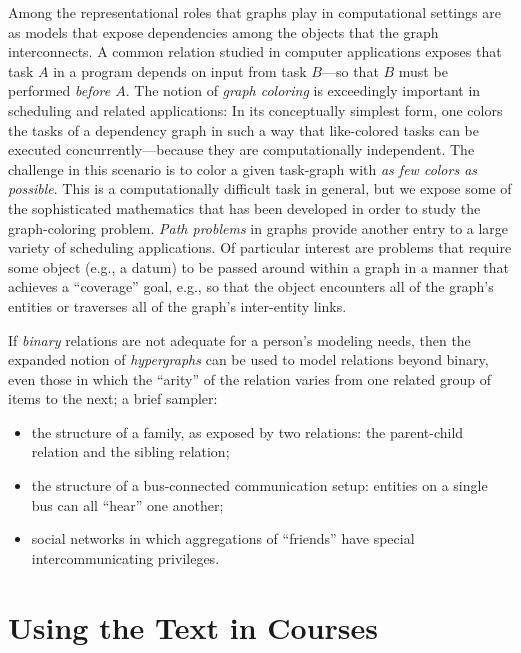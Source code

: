 \smallskip

Among the representational roles that graphs play in computational settings are as models that expose dependencies among the objects that the graph interconnects.  A common relation studied in computer applications exposes that task $A$ in a program depends on input from task $B$---so that $B$ must be performed {\em before $A$}.  The notion of {\it graph coloring} is exceedingly important in scheduling and related applications: In its conceptually simplest form, one colors the tasks of a dependency graph in such a way that like-colored tasks can be executed concurrently---because they are computationally independent.  The challenge in this scenario is to color a given task-graph with {\em as few colors as possible}.  This is a computationally difficult task in general, but we expose some of the sophisticated mathematics that has been developed in order to study the graph-coloring problem.  {\em Path problems} in graphs provide another entry to a large variety of scheduling applications.  Of particular interest are problems that require some object (e.g., a datum) to be passed around within a graph in a manner that achieves a ``coverage'' goal, e.g., so that the object encounters all of the graph's entities or traverses all of the graph's inter-entity links.

\medskip

If {\em binary} relations are not adequate for a person's modeling needs, then the expanded notion of {\em hypergraphs} can be used to model relations beyond binary, even those in which the ``arity'' of the relation varies from one related group of items to the next; a brief sampler:
\begin{itemize}
\item
the structure of a family, as exposed by two relations: the parent-child relation and the sibling relation;
\medskip\item
the structure of a bus-connected communication setup: entities on a single bus can all ``hear'' one another;
\medskip\item
social networks in which aggregations of ``friends'' have special intercommunicating privileges.
\end{itemize}


\section{Using the Text in Courses}
\label{sec:how-to-use}

